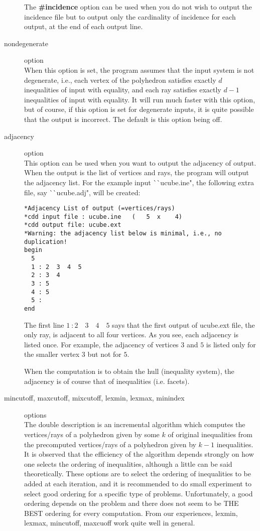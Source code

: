 \begin{description}
The {\bf \#incidence} option can be used when you do not wish
to output the incidence file but to output only the cardinality of incidence
for each output, at the end of each output line.


\item[nondegenerate] option\\
When this option is set, the program assumes that the input system
is not degenerate, i.e., each vertex of the polyhedron satisfies
exactly $d$ inequalities of input with equality, 
and each ray satisfies exactly $d-1$ inequalities of input with equality.
It will run much faster with this option, but of course, 
if this option is set for degenerate inputs, it is 
quite possible that the output is incorrect.  
The default is this option being off.

\item[adjacency] option\\
This option can be used when you want to output the adjacency of output.
When the output is the list of vertices and rays, the program will
output the adjacency list.  For the example input ^^ ^^ ucube.ine",
the following extra file, say ^^ ^^ ucube.adj", will be created:
\begin{verbatim}
*Adjacency List of output (=vertices/rays)
*cdd input file : ucube.ine   (   5  x    4)
*cdd output file: ucube.ext
*Warning: the adjacency list below is minimal, i.e., no duplication!
begin
  5
  1 : 2  3  4  5 
  2 : 3  4 
  3 : 5 
  4 : 5 
  5 :
end
\end{verbatim}
The first line $ 1\: : 2 \quad  3 \quad  4 \quad  5 $ says that the first output of
ucube.ext file, the only ray, is adjacent to all four vertices. As you
see, each adjacency is listed once.  For example, the adjacency of vertices $3$ and $5$
is listed only for the smaller vertex $3$ but not for $5$.

When the computation is to obtain the hull (inequality system),
the adjacency is of course that of inequalities (i.e. facets).

\item[mincutoff, maxcutoff, mixcutoff, lexmin, lexmax, minindex] options\\
The double description is an incremental algorithm which
computes the vertices/rays of a polyhedron given by some $k$ of
original inequalities from the precomputed vertices/rays of a
polyhedron given by $k-1$ inequalities.  It is observed that
the efficiency of the algorithm depends strongly on how
one selects the ordering of inequalities, although a little
can be said theoretically.
These options are to select the ordering of inequalities to be
added at each iteration, and it is recommended to do small
experiment to select good ordering for a specific type of problems.
Unfortunately, a good ordering depends on the problem and there does not seem 
to be THE BEST ordering for every computation.  From our experiences,
lexmin, lexmax, mincutoff, maxcuoff work quite well in general.



\end{description}
